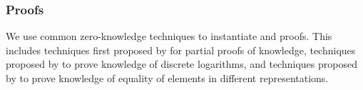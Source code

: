 %
%
%

\subsubsection{Proofs} \label{sec:bpr-proofs}
We use common zero-knowledge techniques to instantiate \PoE and \PoM proofs.
This includes techniques first proposed by \citet{CramerDS94} for partial proofs of knowledge, techniques proposed by \citet{Schnorr91} to prove knowledge of discrete logarithms, and techniques proposed by \citet{Chaum93} to prove knowledge of equality of elements in different representations.

